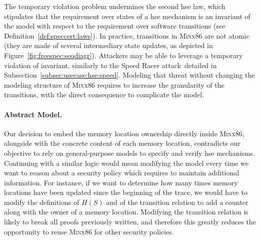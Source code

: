 The temporary violation problem undermines the second \ac{hse} law, which
stipulates that the requirement over states of a \ac{hse} mechanism is an
invariant of the model with respect to the requirement over software transitions
(see Definition~\ref{def:speccert:laws}).
%
In practice, transitions in {\scshape Minx86} are not atomic (they are made of
several intermediary state updates, as depicted in
Figure~\ref{fig:freespec:seqdiagr}).
%
Attackers may be able to leverage a temporary violation of invariant, similarly
to the Speed Racer attack\,\cite{kallenberg2015racecondition} detailed in
Subsection~\ref{subsec:usecase:hse:speed}.
%
Modeling that threat without changing the modeling structure of {\scshape
  Minx86} requires to increase the granularity of the transitions, with the
direct consequence to complicate the model.

\paragraph{Abstract Model.}
%
Our decision to embed the memory location ownership directly inside {\scshape
  Minx86}, alongside with the concrete content of each memory location,
contradicts our objective to rely on general-purpose models to specify and
verify \ac{hse} mechanisms.
%
Continuing with a similar logic would mean modifying the model every time we want
to reason about a security policy which requires to maintain additional
information.
%
For instance, if we want to determine how many times memory locations have been
updated since the beginning of the trace, we would have to modify the
definitions of \( H(S) \) and of the transition relation to add a counter along
with the owner of a memory location.
%
Modifying the transition relation is likely to break all proofs previously
written, and therefore this greatly reduces the opportunity to reuse {\scshape
  Minx86} for other security policies.
%


